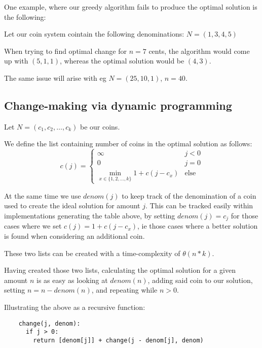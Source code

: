 \documentclass[a4paper]{scrartcl}
\begin{document}
One example, where our greedy algorithm fails to produce the optimal solution
is the following:

Let our coin system cointain the following denominations: $N = (1, 3, 4, 5)$

When trying to find optimal change for $n = 7$ cents, the algorithm would come up
with $(5, 1, 1)$, whereas the optimal solution would be $(4, 3)$.

The same issue will arise with eg $N = (25, 10, 1)$, $n = 40$.

\subsection{Change-making via dynamic programming}

Let $N = (c_1, c_2, \dots, c_k)$ be our coins.

We define the list containing number of coins in the optimal solution as follows:
\[
	c(j) = 
	\begin{cases} 
		\infty & j < 0  \\
		0 & j = 0 \\
		\min_{x \in \{1, 2, \dots, k\}} 1 + c(j - c_x) & \text{else}
	\end{cases}
\]

At the same time we use $denom(j)$ to keep track of the denomination of a coin
used to create the ideal solution for amount $j$. This can be tracked easily
within implementations generating the table above, by setting $denom(j) = c_j$
for those cases where we set $c(j) = 1 + c(j - c_x)$, ie those cases where a
better solution is found when considering an additional coin.

These two lists can be created with a time-complexity of $\theta(n * k)$.

Having created those two lists, calculating the optimal solution for a given
amount $n$ is as easy as looking at $denom(n)$, adding said coin to our
solution, setting $n = n - denom(n)$, and repeating while $n > 0$.

Illustrating the above as a recursive function:
\begin{lstlisting}
	change(j, denom):
	  if j > 0:
	    return [denom[j]] + change(j - denom[j], denom)
\end{lstlisting}
\end{document}
